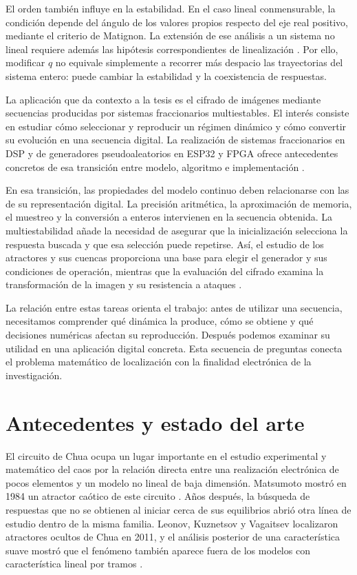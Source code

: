 El orden también influye en la estabilidad. En el caso lineal conmensurable,
la condición depende del ángulo de los valores propios respecto del eje real
positivo, mediante el criterio de Matignon. La extensión de ese análisis a
un sistema no lineal requiere además las hipótesis correspondientes de
linealización \cite{Matignon1996,CongDoanSiegmundTuan2016}. Por ello,
modificar \(q\) no equivale simplemente a recorrer más despacio las
trayectorias del sistema entero: puede cambiar la estabilidad y la
coexistencia de respuestas.

La aplicación que da contexto a la tesis es el cifrado de imágenes mediante
secuencias producidas por sistemas fraccionarios multiestables. El interés
consiste en estudiar cómo seleccionar y reproducir un régimen dinámico y
cómo convertir su evolución en una secuencia digital. La realización de
sistemas fraccionarios en DSP y de generadores pseudoaleatorios en ESP32 y
FPGA ofrece antecedentes concretos de esa transición entre modelo,
algoritmo e implementación
\cite{Wu2023ArctanChua,Fraga2026_54625}.

En esa transición, las propiedades del modelo continuo deben relacionarse
con las de su representación digital. La precisión aritmética, la
aproximación de memoria, el muestreo y la conversión a enteros intervienen
en la secuencia obtenida. La multiestabilidad añade la necesidad de asegurar
que la inicialización selecciona la respuesta buscada y que esa selección
puede repetirse. Así, el estudio de los atractores y sus cuencas proporciona
una base para elegir el generador y sus condiciones de operación, mientras
que la evaluación del cifrado examina la transformación de la imagen y su
resistencia a ataques \cite{Alvarez2006_3e24c,Lima2025_99c51}.

La relación entre estas tareas orienta el trabajo: antes de utilizar una
secuencia, necesitamos comprender qué dinámica la produce, cómo se obtiene
y qué decisiones numéricas afectan su reproducción. Después podemos
examinar su utilidad en una aplicación digital concreta. Esta secuencia de
preguntas conecta el problema matemático de localización con la finalidad
electrónica de la investigación.

\section{Antecedentes y estado del arte}
\label{sec:antecedentes}

El circuito de Chua ocupa un lugar importante en el estudio experimental y
matemático del caos por la relación directa entre una realización electrónica
de pocos elementos y un modelo no lineal de baja dimensión. Matsumoto mostró
en 1984 un atractor caótico de este circuito
\cite{Matsumoto1984Chua}. Años después, la búsqueda de respuestas que no se
obtienen al iniciar cerca de sus equilibrios abrió otra línea de estudio
dentro de la misma familia. Leonov, Kuznetsov y Vagaitsev localizaron
atractores ocultos de Chua en 2011, y el análisis posterior de una
característica suave mostró que el fenómeno también aparece fuera de los
modelos con característica lineal por tramos
\cite{LeonovKuznetsovVagaitsev2011,Leonov2013HiddenAttractors}.

